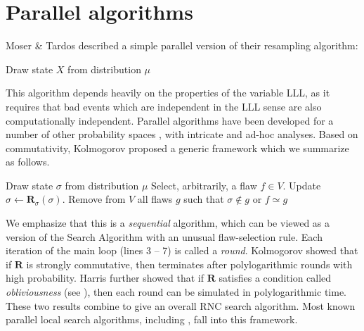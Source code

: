 \documentclass{toc}
\begin{document}
\section{Parallel algorithms} 
\label{sec:parallel}
Moser \& Tardos \cite{MT} described a simple parallel version of their resampling algorithm:
\begin{algorithm}[H]
\centering
\begin{algorithmic}[1]
\State Draw state $X$ from distribution $\mu$
\EndWhile
\end{algorithmic}
\caption{Parallel Moser-Tardos algorithm}
\label{mt-par-alg}
\end{algorithm}

This algorithm depends heavily on the properties of the variable LLL, as it requires that bad events which are independent in the LLL sense are also computationally independent.  Parallel algorithms have been developed for a number of other probability spaces \cite{PermHarris, LLLLBeyond}, with intricate and ad-hoc analyses. Based on commutativity, Kolmogorov \cite{Kolmofocs} proposed a generic framework which we summarize as follows. %
\begin{algorithm}[H]
\centering
\begin{algorithmic}[1]
\State Draw state $\sigma$ from distribution $\mu$
\State Select, arbitrarily, a flaw $f \in V$.
\State Update $\sigma \leftarrow \mathbf R_{\sigma} (\sigma)$.
\State Remove from $V$ all flaws $g$ such that $\sigma \notin g$ or $f \simeq g$
\EndWhile
\EndWhile
\end{algorithmic}
\caption{Generic parallel resampling framework}
\label{kolm-alg}
\end{algorithm}

We emphasize that this is a \emph{sequential} algorithm, which can be viewed as a version of the Search Algorithm with an unusual flaw-selection rule. Each iteration of the main loop (lines 3 -- 7) is called a \emph{round}.  Kolmogorov showed that if $\mathbf R$ is strongly commutative, then  terminates after polylogarithmic rounds with high probability. Harris \cite{ParallelHarris} further showed that if $\mathbf R$ satisfies a %
condition  %
called \emph{obliviousness} (see ), then each round can be simulated in polylogarithmic time. These two results combine to give an overall RNC search algorithm.   Most known parallel local search algorithms, including  , fall into this framework. 
\end{document}
